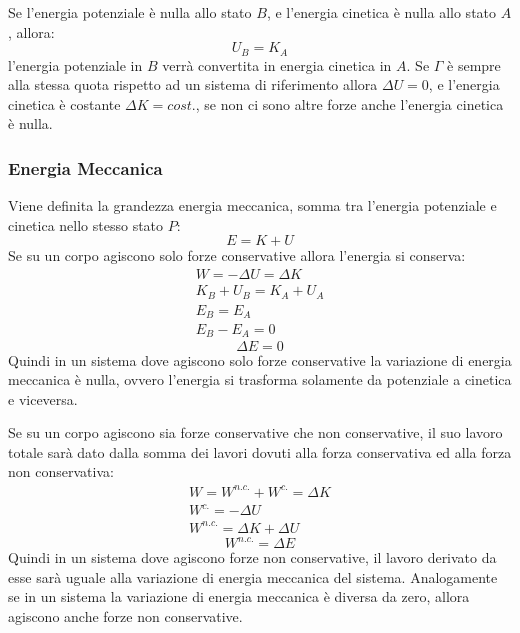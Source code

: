 \documentclass{article}
\numberwithin{equation}{subsection}
\begin{document}
Se l'energia potenziale è nulla allo stato $B$, e l'energia cinetica 
è nulla allo stato $A$, allora:
\begin{equation*}
    U_B=K_A
\end{equation*}
l'energia potenziale in $B$ verrà convertita in energia cinetica in $A$.
Se $\Gamma$ è sempre alla stessa 
quota rispetto ad un sistema di riferimento allora $\Delta U=0$, 
e l'energia cinetica è costante $\Delta K = cost.$, se non ci sono 
altre forze anche l'energia cinetica è nulla.

\subsubsection{Energia Meccanica}
Viene definita la grandezza energia meccanica, somma tra 
l'energia potenziale e cinetica nello stesso stato $P$:
\begin{equation}
    E=K+U
\end{equation}
Se su un corpo agiscono solo forze conservative allora l'energia si conserva: 
\begin{gather*}
    W=-\Delta U = \Delta K\\    
    K_B+U_B=K_A+U_A\\
    E_B=E_A\\
    E_B-E_A=0
\end{gather*}
\begin{equation}
    \Delta E=0
\end{equation}
Quindi in un sistema dove agiscono solo forze conservative la 
variazione di energia meccanica è nulla, ovvero l'energia si 
trasforma solamente da potenziale a cinetica e viceversa. 




Se su un corpo agiscono sia forze conservative che non 
conservative, il suo lavoro totale sarà dato dalla somma dei 
lavori dovuti alla forza conservativa ed alla forza non 
conservativa: 
\begin{gather*}
    W=W^{n.c.}+W^{c.}=\Delta K\\
    W^{c.}=-\Delta U\\
    W^{n.c.}=\Delta K +\Delta U
\end{gather*}
\begin{equation}
    W^{n.c.}=\Delta E
\end{equation}
Quindi in un sistema dove agiscono forze non conservative, il 
lavoro derivato da esse sarà uguale alla variazione di energia 
meccanica del sistema. Analogamente se in un sistema la 
variazione di energia meccanica è diversa da zero, allora 
agiscono anche forze non conservative.
\end{document}
